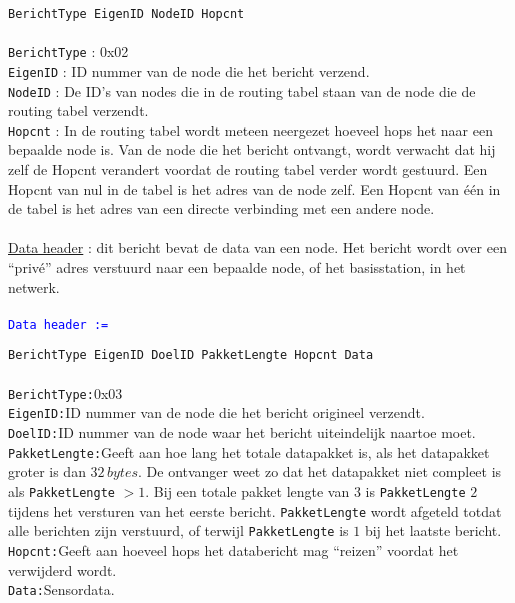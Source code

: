 \documentclass[a4paper, 11pt]{article}
\newcommand{\blue}[1]{\textcolor{blue}{#1}}
\begin{document}
\texttt{BerichtType EigenID NodeID Hopcnt}\\\\
\texttt{BerichtType} : 0x02\\
\texttt{EigenID} : ID nummer van de node die het bericht verzend.\\
\texttt{NodeID} : De ID’s van nodes die in de routing tabel staan van de node die de routing tabel verzendt.\\
\texttt{Hopcnt} : In de routing tabel wordt meteen neergezet hoeveel hops het naar een bepaalde
node is. Van de node die het bericht ontvangt, wordt verwacht dat hij zelf de Hopcnt
verandert voordat de routing tabel verder wordt gestuurd. Een Hopcnt van nul in de tabel is
het adres van de node zelf. Een Hopcnt van één in de tabel is het adres van een directe
verbinding met een andere node.\\\\
\underline{Data header} : dit bericht bevat de data van een node. Het bericht wordt over een “privé”
adres verstuurd naar een bepaalde node, of het basisstation, in het netwerk.\\\\
\blue{\texttt{Data header :=}}

\texttt{BerichtType EigenID DoelID PakketLengte Hopcnt Data}\\\\
\texttt{BerichtType:}0x03\\ 
\texttt{EigenID:}ID nummer van de node die het bericht origineel verzendt.\\
\texttt{DoelID:}ID nummer van de node waar het bericht uiteindelijk naartoe moet.\\
\texttt{PakketLengte:}Geeft aan hoe lang het totale datapakket is, als het datapakket groter is dan $32\, bytes$. De ontvanger weet zo dat het datapakket niet compleet is als \texttt{PakketLengte} $> 1$. Bij een totale pakket lengte van $3$ is \texttt{PakketLengte} $2$ tijdens het versturen van het eerste bericht. \texttt{PakketLengte} wordt afgeteld totdat alle berichten zijn verstuurd, of terwijl \texttt{PakketLengte} is $1$ bij het laatste bericht.\\
\texttt{Hopcnt:}Geeft aan hoeveel hops het databericht mag “reizen” voordat het verwijderd wordt.\\
\texttt{Data:}Sensordata.
\end{document}
